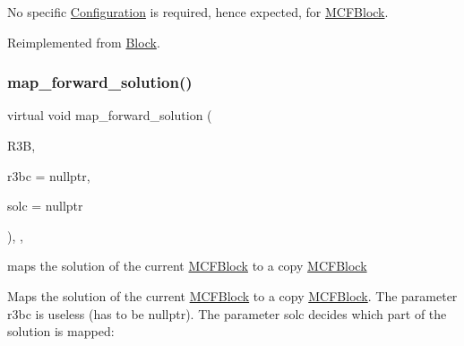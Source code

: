 No specific \mbox{\hyperlink{class_s_m_spp__di__unipi__it_1_1_configuration}{Configuration}} is required, hence expected, for \mbox{\hyperlink{class_s_m_spp__di__unipi__it_1_1_m_c_f_block}{M\+C\+F\+Block}}. 

Reimplemented from \mbox{\hyperlink{class_s_m_spp__di__unipi__it_1_1_block_a26eeed482e287e1f8a384826c789f9e0}{Block}}.

\mbox{\label{class_s_m_spp__di__unipi__it_1_1_m_c_f_block_af990663a09f7203179f903e91c6bb3f1}} 
\subsubsection{\texorpdfstring{map\+\_\+forward\+\_\+solution()}{map\_forward\_solution()}}
{\footnotesize\ttfamily virtual void map\+\_\+forward\+\_\+solution (\begin{DoxyParamCaption}\item[{\mbox{\hyperlink{class_s_m_spp__di__unipi__it_1_1_block}{Block}} $\ast$}]{R3B,  }\item[{\mbox{\hyperlink{class_s_m_spp__di__unipi__it_1_1_configuration}{Configuration}} $\ast$}]{r3bc = {\ttfamily nullptr},  }\item[{\mbox{\hyperlink{class_s_m_spp__di__unipi__it_1_1_configuration}{Configuration}} $\ast$}]{solc = {\ttfamily nullptr} }\end{DoxyParamCaption})\hspace{0.3cm}{\ttfamily [final]}, {\ttfamily [override]}, {\ttfamily [virtual]}}



maps the solution of the current \mbox{\hyperlink{class_s_m_spp__di__unipi__it_1_1_m_c_f_block}{M\+C\+F\+Block}} to a copy \mbox{\hyperlink{class_s_m_spp__di__unipi__it_1_1_m_c_f_block}{M\+C\+F\+Block}} 

Maps the solution of the current \mbox{\hyperlink{class_s_m_spp__di__unipi__it_1_1_m_c_f_block}{M\+C\+F\+Block}} to a copy \mbox{\hyperlink{class_s_m_spp__di__unipi__it_1_1_m_c_f_block}{M\+C\+F\+Block}}. The parameter r3bc is useless (has to be nullptr). The parameter solc decides which part of the solution is mapped\+:


